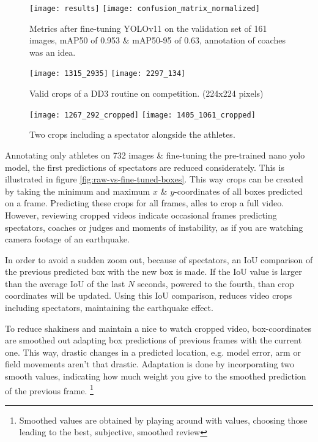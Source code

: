 \begin{figure}
    \centering
    \texttt{[image: results]}
    \texttt{[image: confusion\_matrix\_normalized]}
    \caption[metrics after fine-tuning YOLOv11]{Metrics after fine-tuning YOLOv11 on the validation set of 161 images, mAP50 of 0.953 \& mAP50-95 of 0.63, annotation of coaches was an idea.}
    \label{fig:localization-results}
\end{figure}

\begin{figure}
    \centering
    \texttt{[image: 1315\_2935]}
    \texttt{[image: 2297\_134]}
    \caption[Valid crops of a DD3 routine on competition.]{Valid crops of a DD3 routine on competition. (224x224 pixels)}
    \label{fig:dd3-crop}
\end{figure}

\begin{figure}
    \centering
    \texttt{[image: 1267\_292\_cropped]}
    \texttt{[image: 1405\_1061\_cropped]}
    \caption[dd3-crop-error]{Two crops including a spectator alongside the athletes.}
    \label{fig:dd3-crop-error}
\end{figure}

Annotating only athletes on 732 images \& fine-tuning the pre-trained nano yolo model, the first predictions of spectators are reduced considerately. This is illustrated in figure \ref{fig:raw-vs-fine-tuned-boxes}.
This way crops can be created by taking the minimum and maximum \(x\) \& \(y\)-coordinates of all boxes predicted on a frame. Predicting these crops for all frames, alles to crop a full video.
However, reviewing cropped videos indicate occasional frames predicting spectators, coaches or judges and moments of instability, as if you are watching camera footage of an earthquake.

In order to avoid a sudden zoom out, because of spectators, an IoU comparison of the previous predicted box with the new box is made. If the IoU value is larger than the average IoU of the last \(N\) seconds, powered to the fourth, than crop coordinates will be updated. Using this IoU comparison, reduces video crops including spectators, maintaining the earthquake effect.


To reduce shakiness and maintain a nice to watch cropped video, box-coordinates are smoothed out adapting box predictions of previous frames with the current one. This way, drastic changes in a predicted location, e.g. model error, arm or field movements aren't that drastic. Adaptation is done by incorporating two smooth values, indicating how much weight you give to the smoothed prediction of the previous frame. \footnote{Smoothed values are obtained by playing around with values, choosing those leading to the best, subjective, smoothed review}

